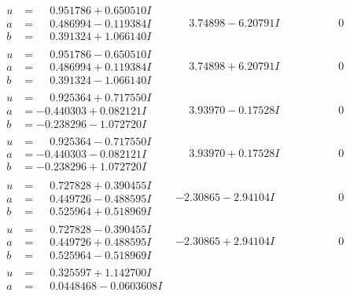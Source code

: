 \documentclass[1p]{elsarticle_modified}
\theoremstyle{definition}
\begin{document}
$$\begin{array}{c|c|c}
\begin{aligned}
u &= \phantom{-}0.951786 + 0.650510 I \\
a &= \phantom{-}0.486994 - 0.119384 I \\
b &= \phantom{-}0.391324 + 1.066140 I\end{aligned}
 & \phantom{-}3.74898 - 6.20791 I & \phantom{-0.000000 } 0 \\ \hline\begin{aligned}
u &= \phantom{-}0.951786 - 0.650510 I \\
a &= \phantom{-}0.486994 + 0.119384 I \\
b &= \phantom{-}0.391324 - 1.066140 I\end{aligned}
 & \phantom{-}3.74898 + 6.20791 I & \phantom{-0.000000 } 0 \\ \hline\begin{aligned}
u &= \phantom{-}0.925364 + 0.717550 I \\
a &= -0.440303 + 0.082121 I \\
b &= -0.238296 - 1.072720 I\end{aligned}
 & \phantom{-}3.93970 - 0.17528 I & \phantom{-0.000000 } 0 \\ \hline\begin{aligned}
u &= \phantom{-}0.925364 - 0.717550 I \\
a &= -0.440303 - 0.082121 I \\
b &= -0.238296 + 1.072720 I\end{aligned}
 & \phantom{-}3.93970 + 0.17528 I & \phantom{-0.000000 } 0 \\ \hline\begin{aligned}
u &= \phantom{-}0.727828 + 0.390455 I \\
a &= \phantom{-}0.449726 - 0.488595 I \\
b &= \phantom{-}0.525964 + 0.518969 I\end{aligned}
 & -2.30865 - 2.94104 I & \phantom{-0.000000 } 0 \\ \hline\begin{aligned}
u &= \phantom{-}0.727828 - 0.390455 I \\
a &= \phantom{-}0.449726 + 0.488595 I \\
b &= \phantom{-}0.525964 - 0.518969 I\end{aligned}
 & -2.30865 + 2.94104 I & \phantom{-0.000000 } 0 \\ \hline\begin{aligned}
u &= \phantom{-}0.325597 + 1.142700 I \\
a &= \phantom{-}0.0448468 - 0.0603608 I \\

\end{aligned}
\end{array}$$
\end{document}
